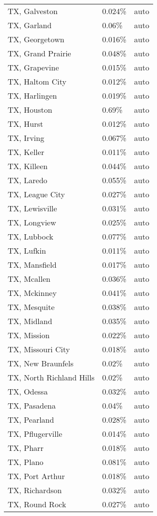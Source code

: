 \begin{longtable}[]{@{}lll@{}}
TX, Galveston & 0.024\% & auto \\
TX, Garland & 0.06\% & auto \\
TX, Georgetown & 0.016\% & auto \\
TX, Grand Prairie & 0.048\% & auto \\
TX, Grapevine & 0.015\% & auto \\
TX, Haltom City & 0.012\% & auto \\
TX, Harlingen & 0.019\% & auto \\
TX, Houston & 0.69\% & auto \\
TX, Hurst & 0.012\% & auto \\
TX, Irving & 0.067\% & auto \\
TX, Keller & 0.011\% & auto \\
TX, Killeen & 0.044\% & auto \\
TX, Laredo & 0.055\% & auto \\
TX, League City & 0.027\% & auto \\
TX, Lewisville & 0.031\% & auto \\
TX, Longview & 0.025\% & auto \\
TX, Lubbock & 0.077\% & auto \\
TX, Lufkin & 0.011\% & auto \\
TX, Mansfield & 0.017\% & auto \\
TX, Mcallen & 0.036\% & auto \\
TX, Mckinney & 0.041\% & auto \\
TX, Mesquite & 0.038\% & auto \\
TX, Midland & 0.035\% & auto \\
TX, Mission & 0.022\% & auto \\
TX, Missouri City & 0.018\% & auto \\
TX, New Braunfels & 0.02\% & auto \\
TX, North Richland Hills & 0.02\% & auto \\
TX, Odessa & 0.032\% & auto \\
TX, Pasadena & 0.04\% & auto \\
TX, Pearland & 0.028\% & auto \\
TX, Pflugerville & 0.014\% & auto \\
TX, Pharr & 0.018\% & auto \\
TX, Plano & 0.081\% & auto \\
TX, Port Arthur & 0.018\% & auto \\
TX, Richardson & 0.032\% & auto \\
TX, Round Rock & 0.027\% & auto \\

\end{longtable}
